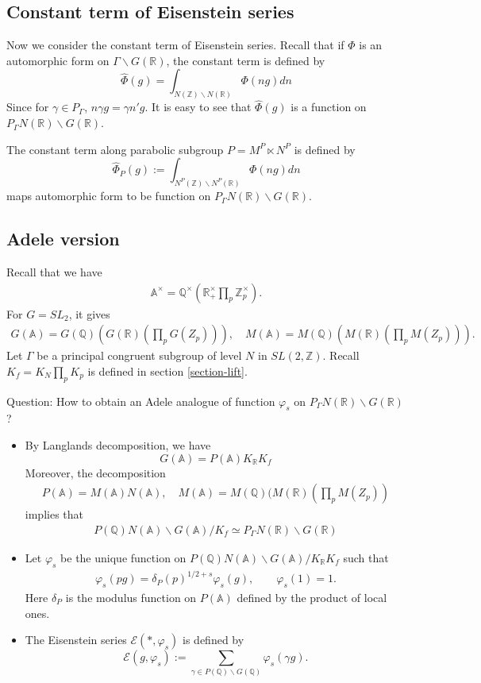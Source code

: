 \documentclass[11pt,reqno]{amsart}
\newcommand{\bea}{\begin{eqnarray}}
\newcommand{\eea}{\end{eqnarray}}
\newcommand{\bna}{\begin{eqnarray*}}
\newcommand{\ena}{\end{eqnarray*}}
\def\A{\mathbb{A}}
\def\R{\mathbb{R}}
\def\Q{\mathbb{Q}}
\def\Z{\mathbb{Z}}
\theoremstyle{definition}
\newcommand{\bit}{\begin{itemize}}
\newcommand{\eit}{\end{itemize}}
\begin{document}
\subsection{Constant term of Eisenstein series}
Now we consider the constant term of Eisenstein series.
Recall that if $\Phi$ is an automorphic form on $\Gamma\backslash G(\R)$, the constant term is defined by
$$
\hat \Phi(g)=\int_{N(\Z) \backslash N(\R)}\Phi(n g)dn
$$
Since for $\gamma\in P_\Gamma$, $ n\gamma g= \gamma n'g$.
It is easy to see that $\hat \Phi(g)$ is a function on $P_\Gamma N(\R)\backslash G(\R)$.


\remark The constant term along parabolic subgroup $P=M^P\ltimes N^P$ is defined by
$$
\hat\Phi_P(g):=\int_{ N^P(\Z)\backslash N^P(\R)}\Phi(ng)dn
$$
maps automorphic form to be function on $P_\Gamma N(\R)\backslash G(\R).$

\subsection{Adele version}
Recall that we have
\bna
\A^\times=\Q^\times(\R^\times_+ \prod_p \Z_p^\times).
\ena
For $G=SL_2$, it gives
\bna
G(\A)= G(\Q)\left(G(\R)(\prod_p G(Z_p))\right),\quad M(\A)= M(\Q)\left(M(\R)(\prod_p M(Z_p))\right).
\ena
Let $\Gamma$ be a principal congruent subgroup of level $N$ in $SL(2,\Z)$. Recall $K_f=K_N\prod_p K_p$ is defined in
section \ref{section-lift}.

Question: How to obtain an Adele analogue of function $\varphi_s$ on $P_\Gamma N(\R)\backslash G(\R)$?
\bit
\item
By Langlands decomposition, we have
$$
G(\A)=P(\A)K_\R K_f
$$
Moreover, the decomposition
\bna
P(\A)=M(\A)N(\A),\quad M(\A)=M(\Q)(M(\R)(\prod_p M(Z_p))
\ena
implies that
\bea
P(\Q)N(\A)\backslash G(\A)/K_f\simeq  P_\Gamma N(\R)\backslash G(\R)
\eea
\item Let $\varphi_s$ be the unique function on $P(\Q)N(\A)\backslash G(\A)/K_\R K_f$
such that
\bna
\varphi_s(pg)=\delta_P(p)^{1/2+s}\varphi_s(g),\qquad \varphi_s(1)=1.
\ena
Here $\delta_P$ is the modulus function on $P(\A)$ defined by the product of local ones.
\item The Eisenstein series $\mathcal E(*,\varphi_s)$ is defined by
$$
\mathcal E(g,\varphi_s):=\sum_{\gamma\in P(\Q)\backslash G(\Q)}\varphi_s(\gamma g).
$$
\eit
\end{document}
